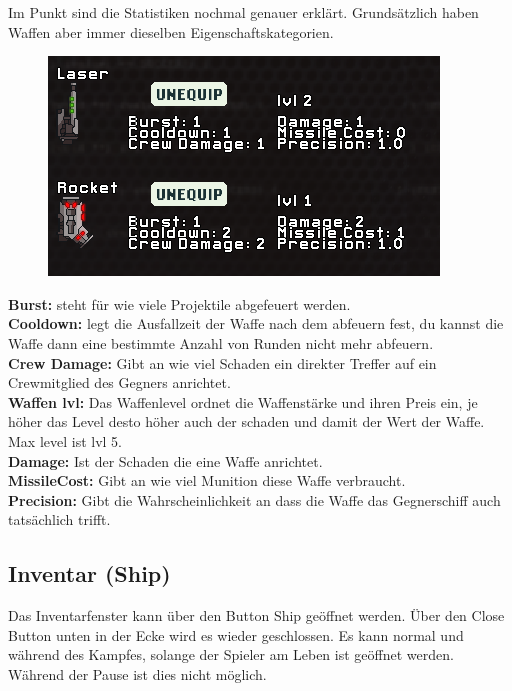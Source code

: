 \documentclass[fontsize=12pt,paper=a4,twoside]{scrartcl}
\begin{document}
Im Punkt  sind die Statistiken nochmal genauer erklärt. Grundsätzlich haben Waffen aber immer dieselben Eigenschaftskategorien.
\begin{figure}[H]
\centering
\includegraphics[width=0.8\linewidth]{DasSpiel/Ui/Weapon_Stats.png}
\end{figure} 

\textbf{Burst:} steht für wie viele Projektile abgefeuert werden.
\\

\textbf{Cooldown:} legt die Ausfallzeit der Waffe nach dem abfeuern fest, du kannst die Waffe dann eine bestimmte Anzahl von Runden nicht mehr abfeuern.
\\

\textbf{Crew Damage:} Gibt an wie viel Schaden ein direkter Treffer 
auf ein Crewmitglied des Gegners anrichtet.
\\

\textbf{Waffen lvl:} Das Waffenlevel ordnet die Waffenstärke und ihren Preis ein, je höher das Level desto höher auch der schaden und damit der Wert der Waffe. Max level ist lvl 5.
\\

\textbf{Damage:} Ist der Schaden die eine Waffe anrichtet.
\\

\textbf{MissileCost:} Gibt an wie viel Munition diese Waffe verbraucht.
\\

\textbf{Precision:} Gibt die Wahrscheinlichkeit an dass die Waffe das Gegnerschiff auch tatsächlich trifft.

\subsection{Inventar (Ship)}

Das Inventarfenster kann über den Button Ship geöffnet werden. Über den Close Button unten in der Ecke wird es wieder geschlossen. Es kann normal und während des Kampfes, solange der Spieler am Leben ist geöffnet werden. Während der Pause ist dies nicht möglich. 
\end{document}
